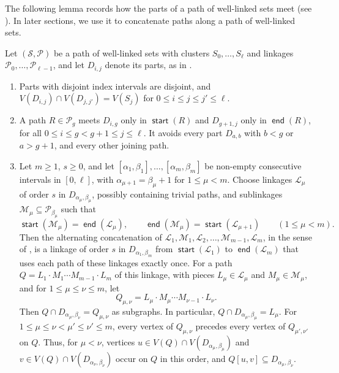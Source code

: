 \documentclass[fontsize=12pt,leading=14pt]{fullpaper}
\DeclareMathOperator{\st}{\mathsf{start}}
\DeclareMathOperator{\en}{\mathsf{end}}
\newcommand{\Lcal}{\mathcal{L}}
\newcommand{\Mcal}{\mathcal{M}}
\newcommand{\Pcal}{\mathcal{P}}
\newcommand{\Scal}{\mathcal{S}}
\begin{document}
The following lemma records how the parts of a path of well-linked sets meet (see ).
In later sections, we use it to concatenate paths along a path of well-linked sets.

\begin{lemma}\label{lem:s3-parts}
  Let $(\Scal,\Pcal)$ be a path of well-linked sets with clusters $S_0,\dots,S_\ell$ and linkages $\Pcal_0,\dots,\Pcal_{\ell-1}$, and let $D_{i,j}$ denote its parts, as in .
  \begin{enumerate}[label=\textnormal{(\roman*)}]
    \item\label{item:s3-parts-disj} Parts with disjoint index intervals are disjoint, and $V(D_{i,j})\cap V(D_{j,j'})=V(S_j)$ for $0\le i\le j\le j'\le\ell$.
    \item\label{item:s3-parts-link} A path $R\in\Pcal_g$ meets $D_{i,g}$ only in $\st(R)$ and $D_{g+1,j}$ only in $\en(R)$, for all $0\le i\le g<g+1\le j\le\ell$.
      It avoids every part $D_{a,b}$ with $b<g$ or $a>g+1$, and every other joining path.
    \item\label{item:s3-parts-concat} Let $m\ge1$, $s\ge0$, and let $[\alpha_1,\beta_1],\dots,[\alpha_m,\beta_m]$ be non-empty consecutive intervals in $[0,\ell]$, with $\alpha_{\mu+1}=\beta_\mu+1$ for $1\le\mu<m$.
      Choose linkages $\Lcal_\mu$ of order $s$ in $D_{\alpha_\mu,\beta_\mu}$, possibly containing trivial paths, and sublinkages $\Mcal_\mu\subseteq\Pcal_{\beta_\mu}$ such that
      \[
        \st(\Mcal_\mu)=\en(\Lcal_\mu),\qquad
        \en(\Mcal_\mu)=\st(\Lcal_{\mu+1})\qquad(1\le\mu<m).
      \]
      Then the alternating concatenation of $\Lcal_1,\Mcal_1,\Lcal_2,\dots,\Mcal_{m-1},\Lcal_m$, in the sense of , is a linkage of order $s$ in $D_{\alpha_1,\beta_m}$ from $\st(\Lcal_1)$ to $\en(\Lcal_m)$ that uses each path of these linkages exactly once.
      For a path $Q=L_1\cdot M_1\cdots M_{m-1}\cdot L_m$ of this linkage, with pieces $L_\mu\in\Lcal_\mu$ and $M_\mu\in\Mcal_\mu$, and for $1\le\mu\le\nu\le m$, let
      \[
        Q_{\mu,\nu}=L_\mu\cdot M_\mu\cdots M_{\nu-1}\cdot L_\nu.
      \]
      Then $Q\cap D_{\alpha_\mu,\beta_\nu}=Q_{\mu,\nu}$ as subgraphs.
      In particular, $Q\cap D_{\alpha_\mu,\beta_\mu}=L_\mu$.
      For $1\le\mu\le\nu<\mu'\le\nu'\le m$, every vertex of $Q_{\mu,\nu}$ precedes every vertex of $Q_{\mu',\nu'}$ on $Q$.
      Thus, for $\mu<\nu$, vertices $u\in V(Q)\cap V(D_{\alpha_\mu,\beta_\mu})$ and $v\in V(Q)\cap V(D_{\alpha_\nu,\beta_\nu})$ occur on $Q$ in this order, and $Q[u,v]\subseteq D_{\alpha_\mu,\beta_\nu}$.
  \end{enumerate}
\end{lemma}
\end{document}
